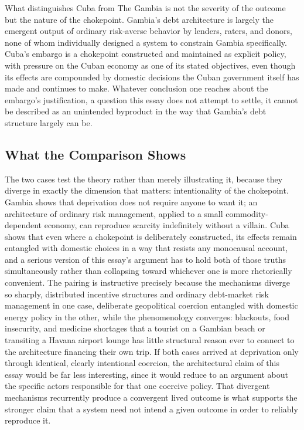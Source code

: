 \documentclass[11pt]{article}
\begin{document}
What distinguishes Cuba from The Gambia is not the severity of the outcome but the nature of the chokepoint. Gambia's debt architecture is largely the emergent output of ordinary risk-averse behavior by lenders, raters, and donors, none of whom individually designed a system to constrain Gambia specifically. Cuba's embargo is a chokepoint constructed and maintained as explicit policy, with pressure on the Cuban economy as one of its stated objectives, even though its effects are compounded by domestic decisions the Cuban government itself has made and continues to make. Whatever conclusion one reaches about the embargo's justification, a question this essay does not attempt to settle, it cannot be described as an unintended byproduct in the way that Gambia's debt structure largely can be.

\subsection{What the Comparison Shows}

The two cases test the theory rather than merely illustrating it, because they diverge in exactly the dimension that matters: intentionality of the chokepoint. Gambia shows that deprivation does not require anyone to want it; an architecture of ordinary risk management, applied to a small commodity-dependent economy, can reproduce scarcity indefinitely without a villain. Cuba shows that even where a chokepoint is deliberately constructed, its effects remain entangled with domestic choices in a way that resists any monocausal account, and a serious version of this essay's argument has to hold both of those truths simultaneously rather than collapsing toward whichever one is more rhetorically convenient. The pairing is instructive precisely because the mechanisms diverge so sharply, distributed incentive structures and ordinary debt-market risk management in one case, deliberate geopolitical coercion entangled with domestic energy policy in the other, while the phenomenology converges: blackouts, food insecurity, and medicine shortages that a tourist on a Gambian beach or transiting a Havana airport lounge has little structural reason ever to connect to the architecture financing their own trip. If both cases arrived at deprivation only through identical, clearly intentional coercion, the architectural claim of this essay would be far less interesting, since it would reduce to an argument about the specific actors responsible for that one coercive policy. That divergent mechanisms recurrently produce a convergent lived outcome is what supports the stronger claim that a system need not intend a given outcome in order to reliably reproduce it.
\end{document}
